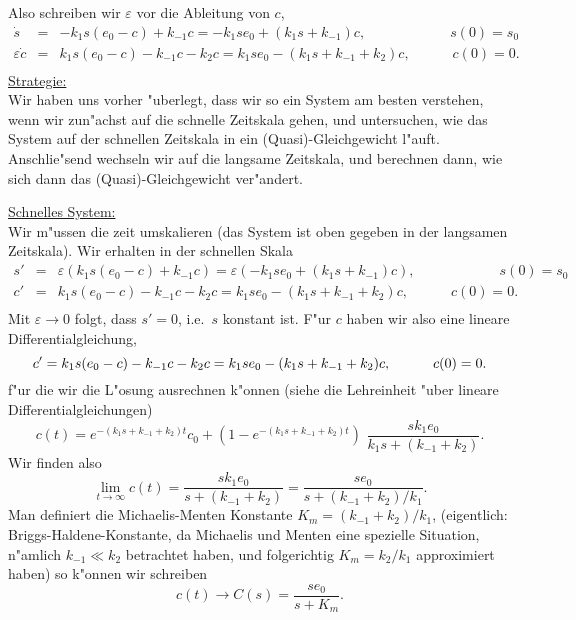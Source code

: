 Also schreiben wir $\varepsilon$ vor die Ableitung von $c$, 
\begin{eqnarray*}
\dot s & = & -k_1 s (e_0-c) + k_{-1} c
        =  -k_1 s e_0 + (k_1 s + k_{-1}) c,\qquad\qquad\qquad s(0) = s_0\\
\varepsilon \dot c & = & k_1 s (e_0-c) - k_{-1} c - k_2 c
        =  k_1 s e_0 - (k_1 s + k_{-1} + k_2) c,\quad\qquad c(0) = 0.\\
\end{eqnarray*}
\underline{Strategie:} \\
Wir haben uns vorher "uberlegt, dass wir so ein System am besten verstehen, 
wenn wir zun"achst auf die schnelle Zeitskala gehen, und untersuchen, wie
das System auf der schnellen Zeitskala in ein (Quasi)-Gleichgewicht l"auft. Anschlie"send wechseln wir auf die langsame Zeitskala, und berechnen dann, wie
sich dann das (Quasi)-Gleichgewicht ver"andert.\par\medskip
\underline{Schnelles System:} \\
Wir m"ussen die zeit umskalieren (das System ist oben gegeben in der langsamen Zeitskala). Wir erhalten in der schnellen Skala
\begin{eqnarray*}
s' & = & \varepsilon(k_1 s (e_0-c) + k_{-1} c)
        =  \varepsilon(-k_1 s e_0 + (k_1 s + k_{-1}) c),\qquad\qquad\qquad s(0) = s_0\\
c' & = & k_1 s (e_0-c) - k_{-1} c - k_2 c
        =  k_1 s e_0 - (k_1 s + k_{-1} + k_2) c,\quad\qquad c(0) = 0.\\
\end{eqnarray*}
Mit $\varepsilon\rightarrow 0$ folgt, dass $s'=0$, i.e.\ $s$ konstant ist. 
F"ur $c$ haben wir also eine lineare Differentialgleichung,
$$
c'  =  k_1 s (e_0-c) - k_{-1} c - k_2 c
        =  k_1 s e_0 - (k_1 s + k_{-1} + k_2) c,\quad\qquad c(0) = 0.\\
$$
f"ur die wir die L"osung ausrechnen k"onnen (siehe die Lehreinheit "uber lineare Differentialgleichungen)
$$ c(t) = e^{-(k_1 s + k_{-1} + k_2) t} c_0 
+ (1-e^{-(k_1 s + k_{-1} + k_2)t}) \,\, 
\frac{s k_1e_0}{ k_1s + (k_{-1} + k_2)} .$$
Wir finden also
$$ \lim_{t\rightarrow\infty}c(t) = \frac{s k_1 e_0}{ s + (k_{-1} + k_2)}  =
\frac{s e_0}{ s + (k_{-1} + k_2)/k_1} .$$
Man definiert die Michaelis-Menten Konstante 
$K_m = (k_{-1} + k_2)/k_1$, 
(eigentlich: Briggs-Haldene-Konstante, 
da Michaelis und Menten eine spezielle Situation, n"amlich $k_{-1}\ll k_2$ betrachtet haben,
und folgerichtig $K_m=k_2/k_1$ approximiert haben)
so k"onnen wir schreiben
$$ c(t)\rightarrow C(s) = \frac{s e_0}{ s + K_m}.$$
